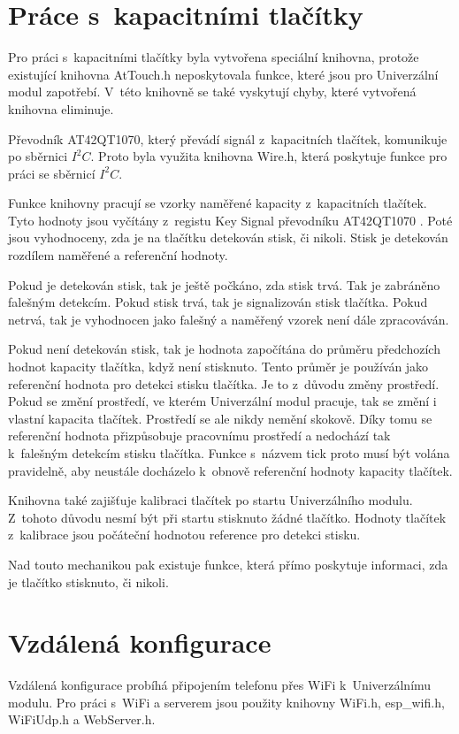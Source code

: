 \section{Práce s~kapacitními tlačítky}
Pro práci s~kapacitními tlačítky byla vytvořena speciální knihovna, protože existující knihovna AtTouch.h neposkytovala funkce, které jsou pro Univerzální modul zapotřebí. V~této knihovně se také 
vyskytují chyby, které vytvořená knihovna eliminuje.

Převodník AT42QT1070, který převádí signál z~kapacitních tlačítek, komunikuje po sběrnici $I^2C$. Proto byla využita knihovna Wire.h, která poskytuje funkce pro práci se sběrnicí $I^2C$.

Funkce knihovny pracují se vzorky naměřené kapacity z~kapacitních tlačítek. Tyto hodnoty jsou vyčítány z~registu Key Signal převodníku AT42QT1070 \cite{conv_cap_but_AT42QT1070_dtsh}. Poté jsou vyhodnoceny, zda je na 
tlačítku detekován stisk, či nikoli. Stisk je detekován rozdílem naměřené a referenční hodnoty. 

Pokud je detekován stisk, tak je ještě počkáno, zda stisk trvá. Tak je zabráněno falešným detekcím. Pokud stisk trvá, tak je signalizován stisk tlačítka. Pokud netrvá, tak je vyhodnocen jako falešný a naměřený vzorek 
není dále zpracováván.

Pokud není detekován stisk, tak je hodnota započítána do průměru předchozích hodnot kapacity tlačítka, když není stisknuto. Tento průměr je používán jako referenční hodnota pro detekci stisku tlačítka. Je to z~důvodu 
změny prostředí. Pokud se změní prostředí, ve kterém Univerzální modul pracuje, tak se změní i vlastní kapacita tlačítek. Prostředí se ale nikdy nemění skokově. Díky tomu se referenční hodnota přizpůsobuje pracovnímu 
prostředí a nedochází tak k~falešným detekcím stisku tlačítka. Funkce s~názvem tick proto musí být volána pravidelně, aby neustále docházelo k~obnově referenční hodnoty kapacity tlačítek. 

Knihovna také zajišťuje kalibraci tlačítek po startu Univerzálního modulu. Z~tohoto důvodu nesmí být při startu stisknuto žádné tlačítko. Hodnoty tlačítek z~kalibrace jsou počáteční hodnotou reference pro detekci stisku. 

Nad touto mechanikou pak existuje funkce, která přímo poskytuje informaci, zda je tlačítko stisknuto, či nikoli. 

\section{Vzdálená konfigurace}
Vzdálená konfigurace probíhá připojením telefonu přes WiFi k~Univerzálnímu modulu. Pro práci s~WiFi a serverem jsou použity knihovny WiFi.h, esp\_wifi.h, WiFiUdp.h a WebServer.h. 


